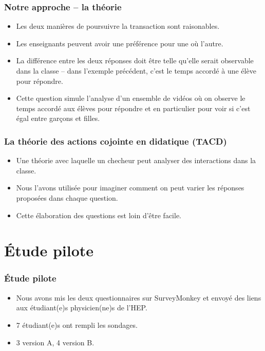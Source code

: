 \documentclass{beamer}
\begin{document}
\begin{frame}
\frametitle{Notre approche -- la théorie}
\begin{itemize}
\item Les deux manières de poursuivre la transaction sont raisonables.
\item Les enseignants peuvent avoir une préférence pour une où l'autre.
\item La différence entre les deux réponses doit être telle qu'elle serait
  observable dans la classe -- dans l'exemple précédent, c'est le temps
  accordé à une élève pour répondre.
\item Cette question simule l'analyse d'un ensemble de vidéos où on
  observe le temps accordé aux élèves pour répondre et en particulier
  pour voir si c'est égal entre garçons et filles.
\end{itemize}
\end{frame}

\begin{frame}
  \frametitle{La théorie des actions cojointe en didatique (TACD)}
  \begin{itemize}
    \item Une théorie avec laquelle un checheur peut analyser des interactions
      dans la classe.
    \item Nous l'avons utilisée pour imaginer comment on peut varier
      les réponses proposées dans chaque question.
      \item Cette élaboration des questions est loin d'être facile.
    \end{itemize}
\end{frame}

\section{Étude pilote}
\begin{frame}
\frametitle{Étude pilote}
  \begin{itemize}
  \item Nous avons mis les deux questionnaires sur SurveyMonkey et envoyé des liens aux étudiant(e)s
  physicien(ne)s de l'HEP.
  \item 7 étudiant(e)s ont rempli les sondages.
    \item 3 version A, 4 version B.
    \end{itemize}

\end{frame}
\end{document}
